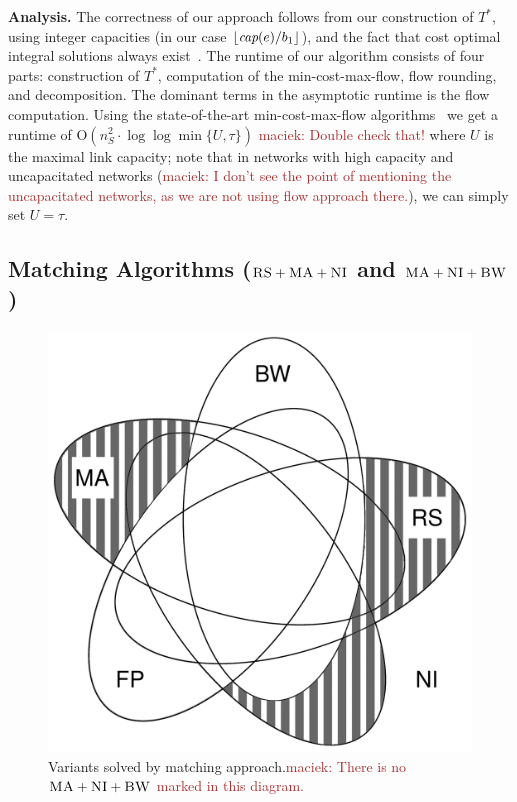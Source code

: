 \documentclass[9pt]{sigcomm-alternate}
\newcommand{\maciek}[1]{\textcolor{brown}{maciek: #1}}
\newcommand{\capacity}{\emph{cap}}
\newcommand{\CC}{\textsc{NI}}
\newcommand{\RS}{\textsc{RS}}
\newcommand{\BW}{\textsc{BW}}
\newcommand{\MA}{\textsc{MA}}
\newcommand{\Tree}{\ensuremath{T}}
\newcommand{\CostTrans}{\ensuremath{b_1}}
\begin{document}
\textbf{Analysis.}
The correctness of our approach follows from our construction
of $\Tree^*$, using integer capacities (in our case $\lfloor\capacity(e)/\CostTrans\rfloor$),
and the fact that cost optimal integral solutions always exist~\cite{flow-book}.
The runtime of our algorithm consists of four parts: construction of $\Tree^*$,
computation of the min-cost-max-flow, flow rounding, and decomposition. The
dominant terms in the asymptotic runtime is the flow computation.
Using the state-of-the-art min-cost-max-flow algorithms~\cite{mincostmaxflow-1,mincostmaxflow-2}
we get a runtime of $\mathrm{O}(n_S^2 \cdot \log\log \min \{U,\tau\})$ 
 \maciek{Double check that!}
where $U$ is the maximal link capacity; note that in networks with high capacity and uncapacitated networks (\maciek{I don't see the point of mentioning the uncapacitated networks, as we are not using flow approach there.}), we can simply
 set $U=\tau$.


\subsection{Matching Algorithms ($\RS+\MA+\CC$ and $\MA+\CC+\BW$)}\label{ssec:match}

\begin{figure}
\includegraphics[width=0.48\columnwidth]{figs/venn_matching.pdf}
\caption{Variants solved by matching approach.\maciek{There is no $\MA+\CC+\BW$ marked in this diagram.}}
\label{fig:venn_match}
\end{figure}
\end{document}
